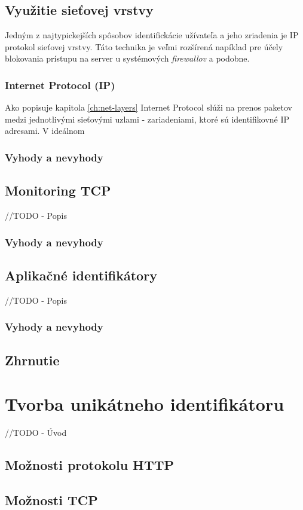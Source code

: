 \documentclass[
  printed, %
  table,   %
  lof,     %
  lot,     %
]{fithesis3}
\begin{document}
\section{Využitie sieťovej vrstvy}
Jedným z najtypickejších spôsobov identifickácie užívateľa a jeho zriadenia je
IP protokol sieťovej vrstvy. Táto technika je veľmi rozšírená napíklad pre
účely blokovania prístupu na server u systémových \textit{firewallov} a
podobne.

\subsection{Internet Protocol (IP)}
Ako popisuje kapitola \ref{ch:net-layers} Internet Protocol slúži na prenos paketov
medzi jednotlivými sieťovými uzlami - zariadeniami, ktoré sú identifikovné
IP adresami. V ideálnom 


\subsection{Vyhody a nevyhody}
\section{Monitoring TCP}
//TODO - Popis
\subsection{Vyhody a nevyhody}
\section{Aplikačné identifikátory}
//TODO - Popis
\subsection{Vyhody a nevyhody}
\section{Zhrnutie}

\chapter{Tvorba unikátneho identifikátoru}
\label{ch:footprint}
//TODO - Úvod
\section{Možnosti protokolu HTTP}
\section{Možnosti TCP}
\end{document}
